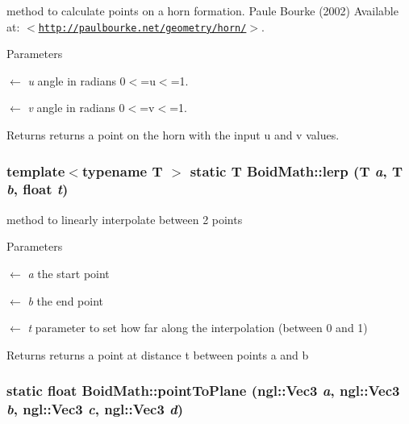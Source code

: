 method to calculate points on a horn formation. Paule Bourke (2002) Available at: $<$\href{http://paulbourke.net/geometry/horn/}{\tt http://paulbourke.net/geometry/horn/}$>$. 
\begin{DoxyParams}{Parameters}
\item[\mbox{$\leftarrow$} {\em u}]angle in radians 0$<$=u$<$=1. \item[\mbox{$\leftarrow$} {\em v}]angle in radians 0$<$=v$<$=1. \end{DoxyParams}
\begin{DoxyReturn}{Returns}
returns a point on the horn with the input u and v values. 
\end{DoxyReturn}
\hypertarget{classBoidMath_aca4c74ae6d21b75541ccaf8007af4d2d}{
\subsubsection[{lerp}]{\setlength{\rightskip}{0pt plus 5cm}template$<$typename T $>$ static T BoidMath::lerp (T {\em a}, \/  T {\em b}, \/  float {\em t})}}
\label{classBoidMath_aca4c74ae6d21b75541ccaf8007af4d2d}


method to linearly interpolate between 2 points 
\begin{DoxyParams}{Parameters}
\item[\mbox{$\leftarrow$} {\em a}]the start point \item[\mbox{$\leftarrow$} {\em b}]the end point \item[\mbox{$\leftarrow$} {\em t}]parameter to set how far along the interpolation (between 0 and 1) \end{DoxyParams}
\begin{DoxyReturn}{Returns}
returns a point at distance t between points a and b 
\end{DoxyReturn}
\hypertarget{classBoidMath_a088202ca86b463ad5573870bd705cd87}{
\subsubsection[{pointToPlane}]{\setlength{\rightskip}{0pt plus 5cm}static float BoidMath::pointToPlane (ngl::Vec3 {\em a}, \/  ngl::Vec3 {\em b}, \/  ngl::Vec3 {\em c}, \/  ngl::Vec3 {\em d})}}
\label{classBoidMath_a088202ca86b463ad5573870bd705cd87}


